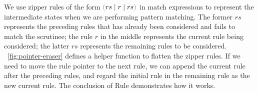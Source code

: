 We use zipper rules of the form $\zrulsP{rs}{r}{rs}$ in match expressions to represent the intermediate states when we are performing pattern matching.
The former $rs$ represents the preceding rules that has already been considered and fails to match the scrutinee; the rule $r$ in the middle represents the current rule being considered; the latter $rs$ represents the remaining rules to be considered.
\figurename~\ref{fig:pointer-eraser} defines a helper function to flatten the zipper rules.
If we need to move the rule pointer to the next rule, we can append the current rule after the preceding rules, and regard the initial rule in the remaining rule as the new current rule.
The conclusion of Rule \ITFailMatch demonstrates how it works.





